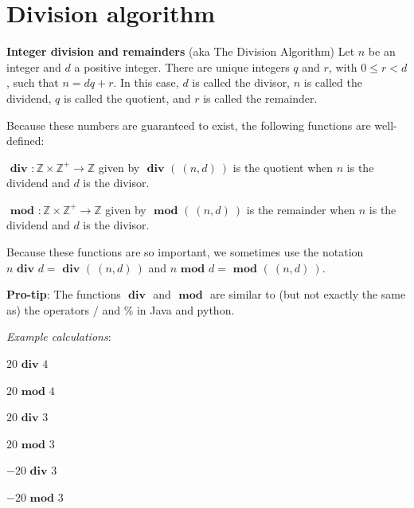 \documentclass[12pt, oneside]{article}
\begin{document}
\begin{flushright}
\end{flushright} \section*{Division algorithm}


{\bf Integer division and remainders} (aka The Division Algorithm) Let $n$ be an integer 
and $d$ a positive integer. There are unique integers $q$ and $r$, with $0 \leq r < d$, such that 
$n = dq + r$. In this case, $d$ is called the divisor, $n$ is called the dividend, 
$q$ is called the quotient, 
and $r$ is called the remainder. 

Because these numbers are guaranteed to exist, the following functions are well-defined: 

$\textbf{ div } : \mathbb{Z} \times \mathbb{Z}^+ \to \mathbb{Z}$ given by $\textbf{ div } ( ~(n,d)~)$ 
is the quotient when $n$ is the dividend and $d$ is the divisor.

$\textbf{ mod } : \mathbb{Z} \times \mathbb{Z}^+ \to \mathbb{Z}$ given by $\textbf{ mod } ( ~(n,d)~)$ 
is the remainder when $n$ is the dividend and $d$ is the divisor.

Because these functions are so important, we sometimes use the notation
$n \textbf{ div } d = \textbf{ div } ( ~(n,d)~)$ and $n \textbf{ mod } d = \textbf{ mod } (~(n,d)~)$.


{\bf Pro-tip}: The functions $\textbf{ div }$ and $\textbf{ mod }$ are similar to (but not exactly the same as) 
the operators $/$ and $\%$ in Java and python.

\vfill

{\it Example calculations}:

$20 \textbf{ div } 4$

\vspace{20pt}

$20 \textbf{ mod } 4$

\vspace{20pt}

$20 \textbf{ div } 3$

\vspace{20pt}

$20 \textbf{ mod } 3$

\vspace{20pt}

$-20 \textbf{ div } 3$

\vspace{20pt}

$-20 \textbf{ mod } 3$

\vfill \vfill
\end{document}
